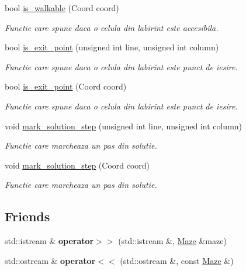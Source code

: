 \begin{DoxyCompactItemize}
bool \hyperlink{classMaze_a345eaa7ceb15067163e32c3efe04ce4c}{is\_\-walkable} (Coord coord)
\begin{DoxyCompactList}\small\item\em Functie care spune daca o celula din labirint este accesibila. \item\end{DoxyCompactList}\item 
bool \hyperlink{classMaze_ac246c826b75f7a89936c4957381589a5}{is\_\-exit\_\-point} (unsigned int line, unsigned int column)
\begin{DoxyCompactList}\small\item\em Functie care spune daca o celula din labirint este punct de iesire. \item\end{DoxyCompactList}\item 
bool \hyperlink{classMaze_aabd5993906681eef8491618fb2cce4c5}{is\_\-exit\_\-point} (Coord coord)
\begin{DoxyCompactList}\small\item\em Functie care spune daca o celula din labirint este punct de iesire. \item\end{DoxyCompactList}\item 
void \hyperlink{classMaze_a07a1b1c1187313a16ec8a2823e7a3019}{mark\_\-solution\_\-step} (unsigned int line, unsigned int column)
\begin{DoxyCompactList}\small\item\em Functie care marcheaza un pas din solutie. \item\end{DoxyCompactList}\item 
void \hyperlink{classMaze_a0b27a912b886cd33a45d53789e4f2f1b}{mark\_\-solution\_\-step} (Coord coord)
\begin{DoxyCompactList}\small\item\em Functie care marcheaza un pas din solutie. \item\end{DoxyCompactList}\end{DoxyCompactItemize}
\subsection*{Friends}
\begin{DoxyCompactItemize}
\item 
\hypertarget{classMaze_af5844881f8fcd17e2c8e5dc036338f85}{
std::istream \& {\bfseries operator$>$$>$} (std::istream \&, \hyperlink{classMaze}{Maze} \&maze)}
\label{classMaze_af5844881f8fcd17e2c8e5dc036338f85}

\item 
\hypertarget{classMaze_af855ad718bd33714d1e871a802a164b2}{
std::ostream \& {\bfseries operator$<$$<$} (std::ostream \&, const \hyperlink{classMaze}{Maze} \&)}
\label{classMaze_af855ad718bd33714d1e871a802a164b2}

\end{DoxyCompactItemize}



